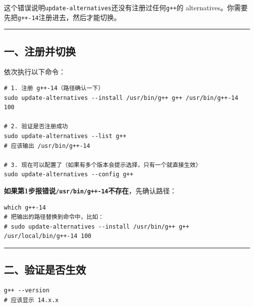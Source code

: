 \documentclass[11pt, a4paper]{article}
\begin{document}
\begin{aibox}
这个错误说明\texttt{update-alternatives}还没有注册过任何\texttt{g++}的 alternatives。你需要先把\texttt{g++-14}注册进去，然后才能切换。

\begin{center}\rule{\textwidth}{0.4pt}\end{center}

\subsection*{一、注册并切换}

依次执行以下命令：

\begin{tcolorbox}[colback=white,colframe=gray!50!white,boxrule=0.5pt,arc=2pt,left=5pt,right=5pt,top=5pt,bottom=5pt]
\begin{verbatim}
# 1. 注册 g++-14（路径确认一下）
sudo update-alternatives --install /usr/bin/g++ g++ /usr/bin/g++-14 100

# 2. 验证是否注册成功
sudo update-alternatives --list g++
# 应该输出 /usr/bin/g++-14

# 3. 现在可以配置了（如果有多个版本会提示选择，只有一个就直接生效）
sudo update-alternatives --config g++
\end{verbatim}
\end{tcolorbox}

\textbf{如果第1步报错说\texttt{/usr/bin/g++-14}不存在}，先确认路径：
\begin{tcolorbox}[colback=white,colframe=gray!50!white,boxrule=0.5pt,arc=2pt,left=5pt,right=5pt,top=5pt,bottom=5pt]
\begin{verbatim}
which g++-14
# 把输出的路径替换到命令中，比如：
# sudo update-alternatives --install /usr/bin/g++ g++ /usr/local/bin/g++-14 100
\end{verbatim}
\end{tcolorbox}

\begin{center}\rule{\textwidth}{0.4pt}\end{center}

\subsection*{二、验证是否生效}

\begin{tcolorbox}[colback=white,colframe=gray!50!white,boxrule=0.5pt,arc=2pt,left=5pt,right=5pt,top=5pt,bottom=5pt]
\begin{verbatim}
g++ --version
# 应该显示 14.x.x
\end{verbatim}
\end{tcolorbox}


\end{aibox}
\end{document}
